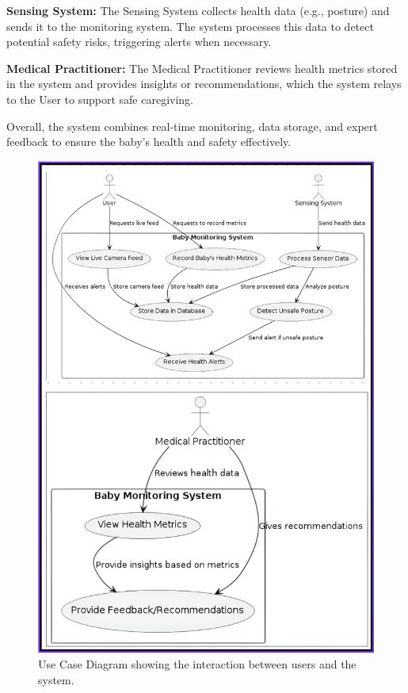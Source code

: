 \documentclass[conference]{IEEEtran}
\begin{document}
\textbf{Sensing System:} The Sensing System collects health data (e.g., posture) and sends it to the monitoring system. The system processes this data to detect potential safety risks, triggering alerts when necessary.
    
\textbf{Medical Practitioner:} The Medical Practitioner reviews health metrics stored in the system and provides insights or recommendations, which the system relays to the User to support safe caregiving.


Overall, the system combines real-time monitoring, data storage, and expert feedback to ensure the baby’s health and safety effectively.

\begin{figure}[hbtp]
  \centering
  \includegraphics[scale=0.5]{./pic/Use case.png}
  \caption{Use Case Diagram showing the interaction between users and the system.}
  \label{fig:usecase}
\end{figure}
\end{document}
